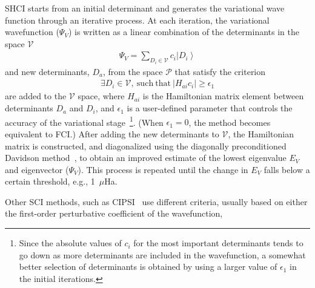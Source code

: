 \documentclass[%
reprint,
 superscriptaddress,
 amsmath,amssymb,
 aps,
]{revtex4-1}
\def\beq{\begin{eqnarray}}
\def\eeq{\end{eqnarray}}
\def\V{\mathcal{V}}
\def\P{\mathcal{P}}
\begin{document}
SHCI starts from an initial determinant
and generates the variational wave function through an iterative process.
At each iteration, the variational wavefunction ($\Psi_V$) is written as a linear combination of the determinants in the space $\V$
\begin{align}
\Psi_{V} = \sum_{D_{i} \in \V} c_{i} \left|D_{i}\right\rangle
\end{align}
and new determinants, ${D_a}$, from the space $\P$ that satisfy the criterion
\beq
\exists D_{i} \in \V , \mathrm{\ such\ that\ } \left|H_{a i} c_{i}\right| \ge \epsilon_{1}
\label{HCI_criterion}
\eeq
are added to the $\V$ space, where
$H_{ai}$ is the Hamiltonian matrix element between determinants $D_a$ and $D_i$, and
$\epsilon_1$ is a user-defined parameter that controls the accuracy of the variational
stage~\footnote{Since the absolute values of $c_i$ for the most important determinants tends to go down as more determinants are
included in the wavefunction, a somewhat better selection of determinants is obtained by using a larger value of
$\epsilon_1$ in the initial iterations.}.
(When $\epsilon_1=0$, the method becomes equivalent to FCI.)
After adding the new determinants to $\V$, the Hamiltonian matrix is constructed, and diagonalized using the diagonally
preconditioned Davidson method~\cite{Dav-CPC-89}, to obtain an improved estimate of the lowest eigenvalue $E_{V}$ and eigenvector ($\Psi_V$).
This process is repeated until the change in $E_V$ falls below a certain threshold, e.g., 1~$\mu$Ha.

Other SCI methods, such as CIPSI~\cite{HurMalRan-JCP-73,EvaDauMal-CP-83} use different criteria, usually based on either the first-order perturbative
coefficient of the wavefunction,
\end{document}
